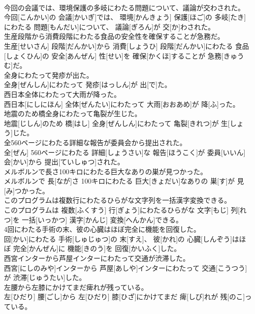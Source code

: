 \documentclass[8pt]{extreport}
\begin{document}
\begin{CJK}{UTF8}{min}
\\	今回の会議では、環境保護の多岐にわたる問題について、議論が交わされた。	
\\	今回[こんかい]の 会議[かいぎ]では、 環境[かんきょう] 保護[ほご]の 多岐[たき]にわたる 問題[もんだい]について、 議論[ぎろん]が 交[か]わされた。
\\	生産段階から消費段階にわたる食品の安全性を確保することが急務だ。	
\\	生産[せいさん] 段階[だんかい]から 消費[しょうひ] 段階[だんかい]にわたる 食品[しょくひん]の 安全[あんぜん] 性[せい]を 確保[かくほ]することが 急務[きゅうむ]だ。
\\	全身にわたって発疹が出た。	
\\	全身[ぜんしん]にわたって 発疹[はっしん]が 出[で]た。
\\	西日本全体にわたって大雨が降った。	
\\	西日本[にしにほん] 全体[ぜんたい]にわたって 大雨[おおあめ]が 降[ふ]った。
\\	地震のため橋全身にわたって亀裂が生じた。	
\\	地震[じしん]のため 橋[はし] 全身[ぜんしん]にわたって 亀裂[きれつ]が 生[しょう]じた。
\\	全560ページにわたる詳細な報告が委員会から提出された。	
\\	全[ぜん] 560ページにわたる 詳細[しょうさい]な 報告[ほうこく]が 委員[いいん] 会[かい]から 提出[ていしゅつ]された。
\\	メルボルンで長さ100キロにわたる巨大なありの巣が見つかった。	
\\	メルボルンで 長[なが]さ 100キロにわたる 巨大[きょだい]なありの 巣[す]が 見[み]つかった。
\\	このプログラムは複数行にわたるひらがな文字列を一括漢字変換できる。	
\\	このプログラムは 複数[ふくすう] 行[ぎょう]にわたるひらがな 文字[もじ] 列[れつ]を 一括[いっかつ] 漢字[かんじ] 変換[へんかん]できる。
\\	4回にわたる手術の末、彼の心臓はほぼ完全に機能を回復した。	
\\	回[かい]にわたる 手術[しゅじゅつ]の 末[すえ]、 彼[かれ]の 心臓[しんぞう]はほぼ 完全[かんぜん]に 機能[きのう]を 回復[かいふく]した。
\\	西宮インターから芦屋インターにわたって交通が渋滞した。	
\\	西宮[にしのみや]インターから 芦屋[あしや]インターにわたって 交通[こうつう]が 渋滞[じゅうたい]した。
\\	左腰から左膝にかけてまだ痺れが残っている。	
\\	左[ひだり] 腰[ごし]から 左[ひだり] 膝[ひざ]にかけてまだ 痺[しび]れが 残[のこ]っている。

\end{CJK}
\end{document}
